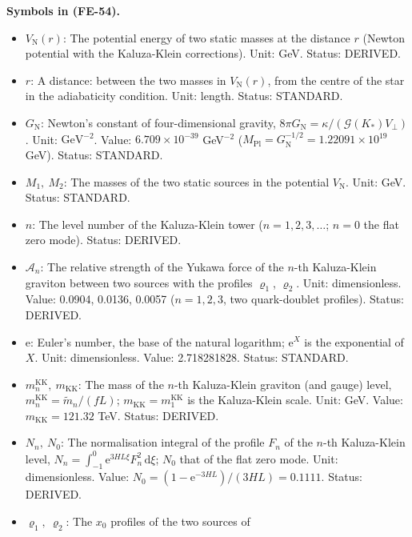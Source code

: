 \documentclass[
  10pt,
]{article}
\providecommand{\tightlist}{%
  \setlength{\itemsep}{0pt}\setlength{\parskip}{0pt}}
\begin{document}
\textbf{Symbols in (FE-54).}

\begin{itemize}
\tightlist
\item
  \(V_{\mathrm{N}}(r)\): The potential energy of two static masses at
  the distance \(r\) (Newton potential with the Kaluza-Klein
  corrections). Unit: GeV. Status: DERIVED.
\item
  \(r\): A distance: between the two masses in \(V_{\mathrm{N}}(r)\),
  from the centre of the star in the adiabaticity condition. Unit:
  length. Status: STANDARD.
\item
  \(G_{\mathrm{N}}\): Newton's constant of four-dimensional gravity,
  \(8\pi G_{\mathrm{N}} = \kappa/(\mathcal{G}(K_*)V_\perp)\). Unit:
  \(\mathrm{GeV}^{-2}\). Value: \(6.709\times10^{-39}\) GeV\(^{-2}\)
  (\(M_{\mathrm{Pl}} = G_{\mathrm{N}}^{-1/2} = 1.22091\times10^{19}\)
  GeV). Status: STANDARD.
\item
  \(M_1,\ M_2\): The masses of the two static sources in the potential
  \(V_{\mathrm{N}}\). Unit: GeV. Status: STANDARD.
\item
  \(n\): The level number of the Kaluza-Klein tower
  (\(n = 1, 2, 3, \dots\); \(n = 0\) the flat zero mode). Status:
  DERIVED.
\item
  \(\mathcal{A}_n\): The relative strength of the Yukawa force of the
  \(n\)-th Kaluza-Klein graviton between two sources with the profiles
  \(\varrho_1\), \(\varrho_2\). Unit: dimensionless. Value: 0.0904,
  0.0136, 0.0057 (\(n = 1, 2, 3\), two quark-doublet profiles). Status:
  DERIVED.
\item
  \(\mathrm{e}\): Euler's number, the base of the natural logarithm;
  \(\mathrm{e}^{X}\) is the exponential of \(X\). Unit: dimensionless.
  Value: 2.718281828. Status: STANDARD.
\item
  \(m^{\mathrm{KK}}_n,\ m_{\mathrm{KK}}\): The mass of the \(n\)-th
  Kaluza-Klein graviton (and gauge) level,
  \(m^{\mathrm{KK}}_n = \tilde m_n/(fL)\);
  \(m_{\mathrm{KK}} = m^{\mathrm{KK}}_1\) is the Kaluza-Klein scale.
  Unit: GeV. Value: \(m_{\mathrm{KK}} = 121.32\) TeV. Status: DERIVED.
\item
  \(N_n,\ N_0\): The normalisation integral of the profile \(F_n\) of
  the \(n\)-th Kaluza-Klein level,
  \(N_n = \int_{-1}^{0}\mathrm{e}^{3HL\xi}F_n^2\,\mathrm{d}\xi\);
  \(N_0\) that of the flat zero mode. Unit: dimensionless. Value:
  \(N_0 = (1 - \mathrm{e}^{-3HL})/(3HL) = 0.1111\). Status: DERIVED.
\item
  \(\varrho_1,\ \varrho_2\): The \(x_0\) profiles of the two sources of

\end{itemize}
\end{document}
